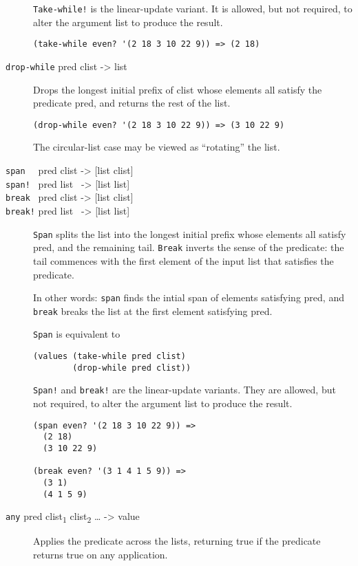 \begin{description}
\texttt{Take-while!} is the linear-update variant. It is allowed, but
not required, to alter the argument list to produce the result.

\begin{verbatim}
(take-while even? '(2 18 3 10 22 9)) => (2 18)
\end{verbatim}
\item[ \href{}{} \texttt{drop-while} pred clist -\textgreater{} list ]
Drops the longest initial prefix of clist whose elements all satisfy the
predicate pred, and returns the rest of the list.

\begin{verbatim}
(drop-while even? '(2 18 3 10 22 9)) => (3 10 22 9)
\end{verbatim}

The circular-list case may be viewed as ``rotating'' the list.
\item[ \href{}{} \texttt{span~~} pred clist -\textgreater{} {[}list
clist{]}\\
\href{}{} \texttt{span!~} pred list~ -\textgreater{} {[}list list{]}\\
\href{}{} \texttt{break~} pred clist -\textgreater{} {[}list clist{]}\\
\href{}{} \texttt{break!} pred list~ -\textgreater{} {[}list list{]} ]
\texttt{Span} splits the list into the longest initial prefix whose
elements all satisfy pred, and the remaining tail. \texttt{Break}
inverts the sense of the predicate: the tail commences with the first
element of the input list that satisfies the predicate.

In other words: \texttt{span} finds the intial span of elements
satisfying pred, and \texttt{break} breaks the list at the first element
satisfying pred.

\texttt{Span} is equivalent to

\begin{verbatim}
(values (take-while pred clist) 
        (drop-while pred clist))
\end{verbatim}

\texttt{Span!} and \texttt{break!} are the linear-update variants. They
are allowed, but not required, to alter the argument list to produce the
result.

\begin{verbatim}
(span even? '(2 18 3 10 22 9)) =>
  (2 18)
  (3 10 22 9)

(break even? '(3 1 4 1 5 9)) =>
  (3 1)
  (4 1 5 9)
\end{verbatim}
\item[ \href{}{} \texttt{any} pred clist\textsubscript{1}
clist\textsubscript{2} \ldots{} -\textgreater{} value ]
Applies the predicate across the lists, returning true if the predicate
returns true on any application.


\end{description}
